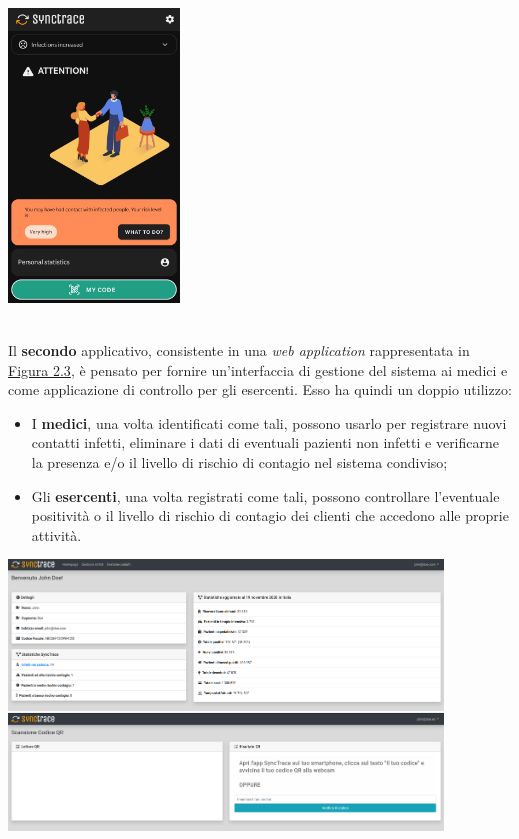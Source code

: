 \begin{minipage}{\linewidth}
  \label{img:synctraceandroid}
  \centering
    \includegraphics[height=7.8cm]{immagini/synctraceandroid}
\end{minipage} \\

Il \textbf{secondo} applicativo, consistente in una \textit{web application} rappresentata in \hyperref[img:webapp]{Figura 2.3}, è pensato per fornire un'interfaccia di gestione del sistema ai medici e come applicazione di controllo per gli esercenti. Esso ha quindi un doppio utilizzo:
\begin{itemize}
  \item I \textbf{medici}, una volta identificati come tali, possono usarlo per registrare nuovi contatti infetti, eliminare i dati di eventuali pazienti non infetti e verificarne la presenza e/o il livello di rischio di contagio nel sistema condiviso;

  \item Gli \textbf{esercenti}, una volta registrati come tali, possono controllare l'eventuale positività o il livello di rischio di contagio dei clienti che accedono alle proprie attività. \\
\end{itemize}

\begin{minipage}{\linewidth}
  \label{img:webapp}
  \centering
    \includegraphics[height=7.2cm]{immagini/webapp}
\end{minipage} \\

